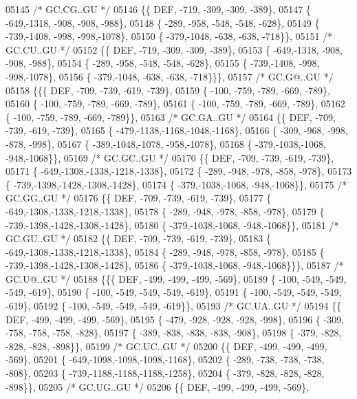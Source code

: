 \begin{DoxyCode}
05145 \textcolor{comment}{/* GC.CG..GU */}
05146 \{\{  DEF, -719, -309, -309, -389\},
05147 \{ -649,-1318, -908, -908, -988\},
05148 \{ -289, -958, -548, -548, -628\},
05149 \{ -739,-1408, -998, -998,-1078\},
05150 \{ -379,-1048, -638, -638, -718\}\},
05151 \textcolor{comment}{/* GC.CU..GU */}
05152 \{\{  DEF, -719, -309, -309, -389\},
05153 \{ -649,-1318, -908, -908, -988\},
05154 \{ -289, -958, -548, -548, -628\},
05155 \{ -739,-1408, -998, -998,-1078\},
05156 \{ -379,-1048, -638, -638, -718\}\}\},
05157 \textcolor{comment}{/* GC.G@..GU */}
05158 \{\{\{  DEF, -709, -739, -619, -739\},
05159 \{ -100, -759, -789, -669, -789\},
05160 \{ -100, -759, -789, -669, -789\},
05161 \{ -100, -759, -789, -669, -789\},
05162 \{ -100, -759, -789, -669, -789\}\},
05163 \textcolor{comment}{/* GC.GA..GU */}
05164 \{\{  DEF, -709, -739, -619, -739\},
05165 \{ -479,-1138,-1168,-1048,-1168\},
05166 \{ -309, -968, -998, -878, -998\},
05167 \{ -389,-1048,-1078, -958,-1078\},
05168 \{ -379,-1038,-1068, -948,-1068\}\},
05169 \textcolor{comment}{/* GC.GC..GU */}
05170 \{\{  DEF, -709, -739, -619, -739\},
05171 \{ -649,-1308,-1338,-1218,-1338\},
05172 \{ -289, -948, -978, -858, -978\},
05173 \{ -739,-1398,-1428,-1308,-1428\},
05174 \{ -379,-1038,-1068, -948,-1068\}\},
05175 \textcolor{comment}{/* GC.GG..GU */}
05176 \{\{  DEF, -709, -739, -619, -739\},
05177 \{ -649,-1308,-1338,-1218,-1338\},
05178 \{ -289, -948, -978, -858, -978\},
05179 \{ -739,-1398,-1428,-1308,-1428\},
05180 \{ -379,-1038,-1068, -948,-1068\}\},
05181 \textcolor{comment}{/* GC.GU..GU */}
05182 \{\{  DEF, -709, -739, -619, -739\},
05183 \{ -649,-1308,-1338,-1218,-1338\},
05184 \{ -289, -948, -978, -858, -978\},
05185 \{ -739,-1398,-1428,-1308,-1428\},
05186 \{ -379,-1038,-1068, -948,-1068\}\}\},
05187 \textcolor{comment}{/* GC.U@..GU */}
05188 \{\{\{  DEF, -499, -499, -499, -569\},
05189 \{ -100, -549, -549, -549, -619\},
05190 \{ -100, -549, -549, -549, -619\},
05191 \{ -100, -549, -549, -549, -619\},
05192 \{ -100, -549, -549, -549, -619\}\},
05193 \textcolor{comment}{/* GC.UA..GU */}
05194 \{\{  DEF, -499, -499, -499, -569\},
05195 \{ -479, -928, -928, -928, -998\},
05196 \{ -309, -758, -758, -758, -828\},
05197 \{ -389, -838, -838, -838, -908\},
05198 \{ -379, -828, -828, -828, -898\}\},
05199 \textcolor{comment}{/* GC.UC..GU */}
05200 \{\{  DEF, -499, -499, -499, -569\},
05201 \{ -649,-1098,-1098,-1098,-1168\},
05202 \{ -289, -738, -738, -738, -808\},
05203 \{ -739,-1188,-1188,-1188,-1258\},
05204 \{ -379, -828, -828, -828, -898\}\},
05205 \textcolor{comment}{/* GC.UG..GU */}
05206 \{\{  DEF, -499, -499, -499, -569\},

\end{DoxyCode}
